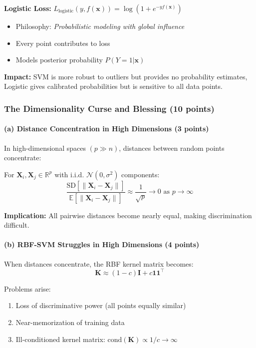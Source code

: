 \documentclass[12pt,a4paper]{article}
\newcommand{\R}{\mathbb{R}}
\theoremstyle{definition}
\begin{document}
\textbf{Logistic Loss:} $L_{\text{logistic}}(y, f(\mathbf{x})) = \log(1 + e^{-yf(\mathbf{x})})$
\begin{itemize}
\item Philosophy: \textit{Probabilistic modeling with global influence}
\item Every point contributes to loss
\item Models posterior probability $P(Y=1|\mathbf{x})$
\end{itemize}

\textbf{Impact:} SVM is more robust to outliers but provides no probability estimates, Logistic gives calibrated probabilities but is sensitive to all data points.

\subsubsection{The Dimensionality Curse and Blessing (10 points)}

\paragraph{(a) Distance Concentration in High Dimensions (3 points)}

In high-dimensional spaces $(p \gg n)$, distances between random points concentrate:

For $\mathbf{X}_i, \mathbf{X}_j \in \R^p$ with i.i.d. $\mathcal{N}(0, \sigma^2)$ components:
\begin{equation}
\frac{\text{SD}[\|\mathbf{X}_i - \mathbf{X}_j\|]}{\mathbb{E}[\|\mathbf{X}_i - \mathbf{X}_j\|]} \approx \frac{1}{\sqrt{p}} \to 0 \text{ as } p \to \infty
\end{equation}

\textbf{Implication:} All pairwise distances become nearly equal, making discrimination difficult.

\paragraph{(b) RBF-SVM Struggles in High Dimensions (4 points)}

When distances concentrate, the RBF kernel matrix becomes:
\begin{equation}
\mathbf{K} \approx (1-c)\mathbf{I} + c\mathbf{1}\mathbf{1}^\top
\end{equation}

Problems arise:
\begin{enumerate}
\item Loss of discriminative power (all points equally similar)
\item Near-memorization of training data
\item Ill-conditioned kernel matrix: $\text{cond}(\mathbf{K}) \propto 1/c \to \infty$
\end{enumerate}
\end{document}
